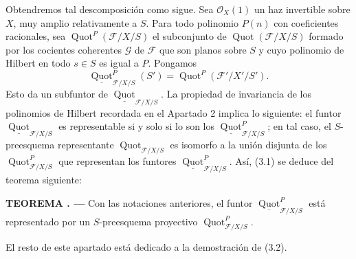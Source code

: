 \documentclass[11pt,twoside,openany]{book}
\numberwithin{equation}{section}
\newcommand{\src}[1]{%
  \phantomsection\hypertarget{src:#1}{}%
  \marginpar{\raggedleft\footnotesize\sffamily #1}%
}
\theoremstyle{plain}
\theoremstyle{definition}
\theoremstyle{remark}
\newcommand{\result}[2]{%
  \par\medskip\noindent\textbf{#1%
  \if\relax\detokenize{#2}\relax\else\space#2\fi. ---}\enspace
}
\newcommand{\FgaUnitKey}{frontmatter}
\renewcommand{\src}[1]{%
  \phantomsection\hypertarget{src:\FgaUnitKey:#1}{}%
  \marginpar{\raggedleft\footnotesize\sffamily #1}%
}
\theoremstyle{plain}
\theoremstyle{definition}
\theoremstyle{remark}
\begin{document}
Obtendremos tal descomposición como sigue. Sea $\mathcal O_X(1)$ un haz
invertible sobre $X$, muy amplio relativamente a $S$. Para todo polinomio
$P(n)$ con coeficientes racionales, sea
$\operatorname{Quot}^P(\mathcal F/X/S)$ el subconjunto de
$\operatorname{Quot}(\mathcal F/X/S)$ formado por los cocientes coherentes
$\mathcal G$ de $\mathcal F$ que son planos sobre $S$ y cuyo polinomio de
Hilbert en todo $s\in S$ es igual a $P$. Pongamos
\[
\underline{\operatorname{Quot}}^P_{\mathcal F/X/S}(S')
=\operatorname{Quot}^P(\mathcal F'/X'/S').
\]
Esto da un subfuntor de
$\underline{\operatorname{Quot}}_{\mathcal F/X/S}$. La propiedad de
invariancia de los polinomios de Hilbert recordada en el Apartado 2 implica lo
siguiente: el funtor $\underline{\operatorname{Quot}}_{\mathcal F/X/S}$ es
representable si y solo si lo son los
$\underline{\operatorname{Quot}}^P_{\mathcal F/X/S}$; en tal caso, el
$S$-preesquema representante $\operatorname{Quot}_{\mathcal F/X/S}$ es
isomorfo a la unión disjunta de los
$\operatorname{Quot}^P_{\mathcal F/X/S}$ que representan los funtores
$\underline{\operatorname{Quot}}^P_{\mathcal F/X/S}$. Así, (3.1) se deduce
del teorema siguiente:
\src{260}
\result{TEOREMA}{3.2} Con las notaciones anteriores, el funtor
$\underline{\operatorname{Quot}}^P_{\mathcal F/X/S}$ está representado por un
$S$-preesquema proyectivo $\operatorname{Quot}^P_{\mathcal F/X/S}$.

El resto de este apartado está dedicado a la demostración de (3.2).
\end{document}
